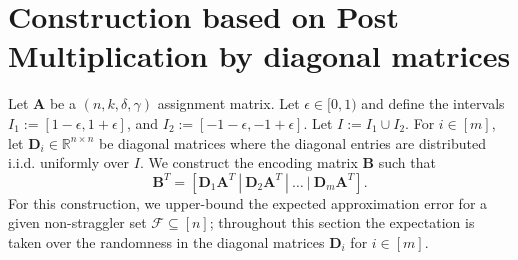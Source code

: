 \documentclass[journal,draftcls,onecolumn]{IEEEtran}
\theoremstyle{mystyle}
\newcommand{\bfD}{\mathbf{D}}
\newcommand{\bfA}{\mathbf{A}}
\newcommand{\aditya}[1]{\marginpar{+}{\bf Aditya's remark}: {\em #1}}
\newcommand{\sifat}[1]{\marginpar{+}{\bf Sifat's remark}: {\em #1}}
\begin{document}

\section{Construction based on Post Multiplication by diagonal matrices}
\label{sec:construction_RDM}




Let $\mathbf{A}$ be a $(n,k, \delta, \gamma)$ assignment matrix.  Let $\epsilon \in [0,1)$ and define the intervals $I_1 := [ 1-\epsilon  ,  1+\epsilon ]$, and 
$I_2 := [ -1-\epsilon , -1+\epsilon ]$. Let $I := I_1 \cup I_2$. %
For $i \in [m]$, let $\mathbf{D}_i \in \mathbb{R}^{n \times n}$ be diagonal matrices where the diagonal entries are distributed i.i.d. uniformly over $I$. We construct the encoding matrix $\mathbf{B}$ such that
\begin{equation}\label{eq:effAD1AD2}
\mathbf{B}^T = [ \bfD_1 \bfA^T ~|~ \bfD_2 \bfA^T ~|~ \dots ~|~ \bfD_m \bfA^T].
\end{equation}
For this construction, we upper-bound the expected approximation error for a given non-straggler set $\mathcal{F} \subseteq [n]$; throughout this section the expectation is taken over the randomness in the diagonal matrices $\mathbf{D}_i$ for $i \in [m]$.
\end{document}
